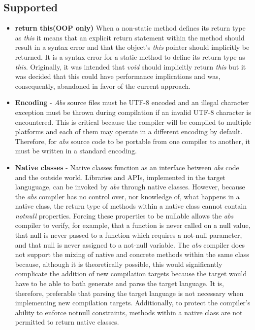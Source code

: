 \documentclass[hidelinks]{article}
\begin{document}
\subsection{Supported}
\begin{itemize}
\item \textbf{return this(OOP only)} When a non-static method defines its return type as \textit{this} it means that an explicit return statement within the method should result in a syntax error and that the object's \textit{this} pointer should implicitly be returned. It is a syntax error for a static method to define its return type as \textit{this}. Originally, it was intended that \textit{void} should implicitly return \textit{this} but it was decided that this could have performance implications and was, consequently, abandoned in favor of the current approach.
\item \textbf{Encoding} - \textit{Abs} source files must be UTF-8 encoded and an illegal character exception must be thrown during compilation if an invalid UTF-8 character is encountered. This is critical because the compiler will be compiled to multiple platforms and each of them may operate in a different encoding by default. Therefore, for \textit{abs} source code to be portable from one compiler to another, it must be written in a standard encoding.
\item \textbf{Native classes} - Native classes function as an interface between \textit{abs} code and the outside world. Libraries and APIs, implemented in the target languguage, can be invoked by \textit{abs} through native classes. However, because the \textit{abs} compiler has no control over, nor knowledge of, what happens in a native class, the return type of methods within a native class cannot contain \textit{notnull} properties. Forcing these properties to be nullable allows the \textit{abs} compiler to verify, for example, that a function is never called on a null value, that null is never passed to a function which requires a not-null parameter, and that null is never assigned to a not-null variable. The \textit{abs} compiler does not support the mixing of native and concrete methods within the same class because, although it is theoretically possible, this would significantly complicate the addition of new compilation targets because the target would have to be able to both generate and parse the target language. It is, therefore, preferable that parsing the target language is not necessary when implementing new compilation targets. Additionally, to protect the compiler's ability to enforce notnull constraints, methods within a native class are not permitted to return native classes.

\end{itemize}
\end{document}
